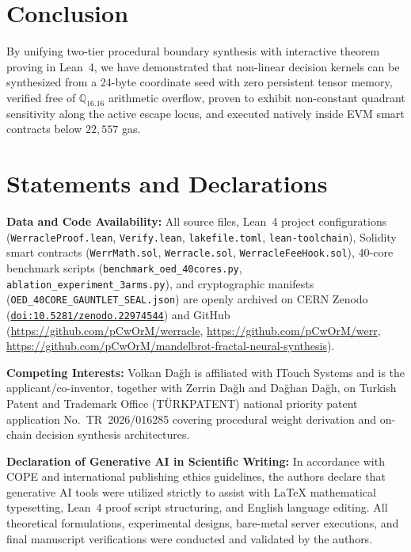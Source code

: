 \documentclass[10pt,a4paper]{article}
\begin{document}
\section{Conclusion}

By unifying two-tier procedural boundary synthesis with interactive theorem proving in Lean~4, we have demonstrated that non-linear decision kernels can be synthesized from a 24-byte coordinate seed with zero persistent tensor memory, verified free of $\mathbb{Q}_{16.16}$ arithmetic overflow, proven to exhibit non-constant quadrant sensitivity along the active escape locus, and executed natively inside EVM smart contracts below $22,557$ gas.

\section*{Statements and Declarations}

\noindent\textbf{Data and Code Availability:} All source files, Lean~4 project configurations (\texttt{WerracleProof.lean}, \texttt{Verify.lean}, \texttt{lakefile.toml}, \texttt{lean-toolchain}), Solidity smart contracts (\texttt{WerrMath.sol}, \texttt{Werracle.sol}, \texttt{WerracleFeeHook.sol}), 40-core benchmark scripts (\texttt{benchmark\_oed\_40cores.py}, \texttt{ablation\_experiment\_3arms.py}), and cryptographic manifests (\texttt{OED\_40CORE\_GAUNTLET\_SEAL.json}) are openly archived on CERN Zenodo (\href{https://doi.org/10.5281/zenodo.22974544}{\texttt{doi:10.5281/zenodo.22974544}}) and GitHub (\url{https://github.com/pCwOrM/werracle}, \url{https://github.com/pCwOrM/werr}, \url{https://github.com/pCwOrM/mandelbrot-fractal-neural-synthesis}).

\vspace{0.4ex}
\noindent\textbf{Competing Interests:} Volkan Dağlı is affiliated with ITouch Systems and is the applicant/co-inventor, together with Zerrin Dağlı and Dağhan Dağlı, on Turkish Patent and Trademark Office (T\"{U}RKPATENT) national priority patent application No.~TR~2026/016285 covering procedural weight derivation and on-chain decision synthesis architectures.

\vspace{0.4ex}
\noindent\textbf{Declaration of Generative AI in Scientific Writing:} In accordance with COPE and international publishing ethics guidelines, the authors declare that generative AI tools were utilized strictly to assist with LaTeX mathematical typesetting, Lean~4 proof script structuring, and English language editing. All theoretical formulations, experimental designs, bare-metal server executions, and final manuscript verifications were conducted and validated by the authors.
\end{document}
